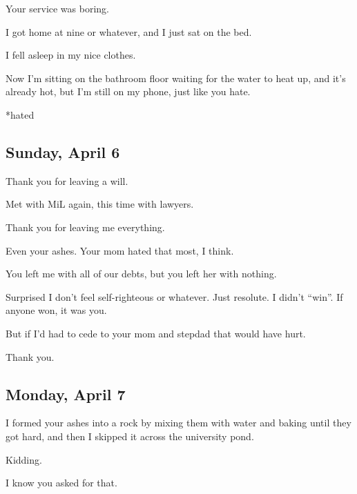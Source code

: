 {
Your service was boring.

I got home at nine or whatever, and
I just sat on the bed.

I fell asleep in my nice clothes.

Now I'm sitting on the bathroom
floor waiting for the water to heat up, and it's already hot, but I'm
still on my phone, just like you hate.

*hated

\newpage

\subsection*{Sunday, April 6}\label{sunday-april-6}

Thank you for leaving a will.

Met with MiL again, this time with
lawyers.

Thank you for leaving me
everything.

Even your ashes. Your mom hated
that most, I think.

You left me with all of our debts,
but you left her with nothing.

Surprised I don't feel
self-righteous or whatever. Just resolute. I didn't ``win''. If anyone
won, it was you.

But if I'd had to cede to your mom
and stepdad that would have hurt.

Thank you.

\newpage

\subsection*{Monday, April 7}\label{monday-april-7}

I formed your ashes into a rock by
mixing them with water and baking until they got hard, and then I
skipped it across the university pond.

Kidding.

I know you asked for that.

}
